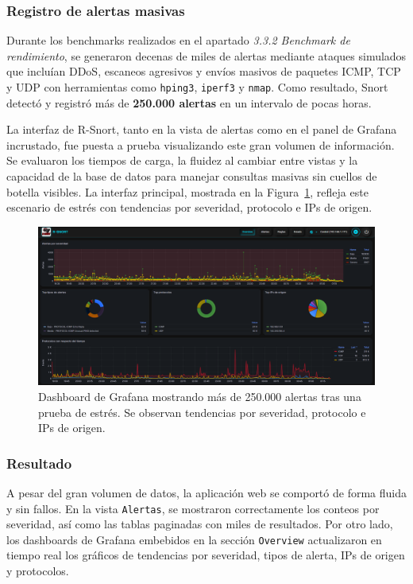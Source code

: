 \documentclass[11pt,a4paper,twoside]{report}
\begin{document}
\subsubsection{Registro de alertas masivas}

Durante los benchmarks realizados en el apartado \textit{3.3.2 Benchmark de rendimiento}, se generaron decenas de miles de alertas mediante ataques simulados que incluían DDoS, escaneos agresivos y envíos masivos de paquetes ICMP, TCP y UDP con herramientas como \texttt{hping3}, \texttt{iperf3} y \texttt{nmap}. Como resultado, Snort detectó y registró más de \textbf{250.000 alertas} en un intervalo de pocas horas.\newline

La interfaz de R-Snort, tanto en la vista de alertas como en el panel de Grafana incrustado, fue puesta a prueba visualizando este gran volumen de información. Se evaluaron los tiempos de carga, la fluidez al cambiar entre vistas y la capacidad de la base de datos para manejar consultas masivas sin cuellos de botella visibles. La interfaz principal, mostrada en la Figura~\ref{fig:alertas_masivas_grafana}, refleja este escenario de estrés con tendencias por severidad, protocolo e IPs de origen.

\begin{figure}[H]
	\centering
	\includegraphics[width=1\textwidth]{pruebas/1.png}
	\caption{Dashboard de Grafana mostrando más de 250.000 alertas tras una prueba de estrés. Se observan tendencias por severidad, protocolo e IPs de origen.}
	\label{fig:alertas_masivas_grafana}
\end{figure}

\subsubsection{Resultado}
A pesar del gran volumen de datos, la aplicación web se comportó de forma fluida y sin fallos. En la vista \texttt{Alertas}, se mostraron correctamente los conteos por severidad, así como las tablas paginadas con miles de resultados. Por otro lado, los dashboards de Grafana embebidos en la sección \texttt{Overview} actualizaron en tiempo real los gráficos de tendencias por severidad, tipos de alerta, IPs de origen y protocolos.\newline
\end{document}
